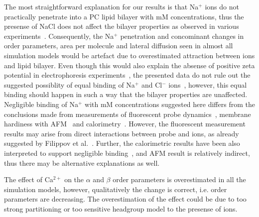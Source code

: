 \documentclass[pre,aps,floatfix,authordate1-4,twocolumn]{revtex4-1}
\begin{document}
The most straightforward explanation for our results is that Na$^+$ ions do not practically penetrate into a PC lipid bilayer
with mM concentrations, thus the presense of NaCl does not affect the bilayer properties as observed in various experiments~\cite{akutsu81,altenbach84,clarke99,binder02,pabst07,filippov09}.
Consequently, the Na$^+$ penetration and concominant changes in order parameters, area per molecule and lateral diffusion 
seen in almost all simulation models would be artefact due to overestimated attraction between ions and lipid bilayer.
Even though this would also explain the absense of positive zeta potential in electrophoresis experiments~\cite{eisenberg79,tatulian87,manyes05,manyes06,klasczyk10},  
the presented data do not rule out the suggested possiblity of equal binding of Na$^+$ and Cl$^-$ ions~\cite{knecht13},
however, this equal binding should happen in such a way that the bilayer properties are unaffected.
Negligible binding of Na$^+$ with mM concentrations suggested here differs from the conclusions made from 
measurements of fluorescent probe dynamics~\cite{bockmann03,vacha09a,harb13}, membrane hardiness with AFM~\cite{manyes05,manyes06,fukuma07,ferber11,morata12} and calorimetry~\cite{bockmann03,klasczyk10}.
However, the fluorescent measurement results may arise from direct interactions between probe and ions, as already suggested by Filippov et al.~\cite{filippov09}. 
Further, the calorimetric results have been also interpreted to support negligible binding~\cite{cevc90}, and AFM result is relatively indirect, thus
there may be alternative explanations as well.

The effect of Ca$^{2+}$ on the $\alpha$ and $\beta$ order parameters is overestimated in all the simulation models, however,
qualitatively the change is correct, i.e. order parameters are decreasing.
The overestimation of the effect could be due to too strong partitioning or too sensitive headgroup model to the presense of ions.
 \\

\end{document}
